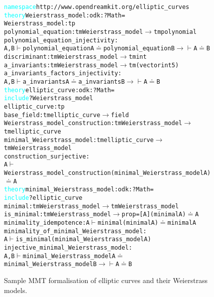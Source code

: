 \begin{figure}
\begin{small}
\begin{alltt}
\textcolor{cyan}{namespace} http://www.opendreamkit.org/elliptic_curves \RS
\textcolor{cyan}{theory} Weierstrass_model : odk:?Math = 
  Weierstrass_model : tp \RS
  polynomial_equation : tm Weierstrass_model \(\rightarrow\) tm polynomial \RS
  polynomial_equation_injectivity : 
    {A, B} \(\vdash\) polynomial_equation A \(\doteq\)  polynomial_equation B \(\rightarrow\) \(\vdash\) A \(\doteq\)  B \RS
  discriminant : tm Weierstrass_model \(\rightarrow\) tm int \RS
  a_invariants : tm Weierstrass_model \(\rightarrow\) tm (vector int 5) \RS
  a_invariants_factors_injectivity : 
    {A,B} \(\vdash\) a_invariants A \(\doteq\) a_invariants B \(\rightarrow\)\(\vdash\) A \(\doteq\) B \RS
\GS
\textcolor{cyan}{theory} elliptic_curve : odk:?Math = 
  \textcolor{cyan}{include} ?Weierstrass_model  \RS
  elliptic_curve : tp  \RS
  base_field : tm elliptic_curve \(\rightarrow\) field \RS
  Weierstrass_model_construction : tm Weierstrass_model \(\rightarrow\) tm elliptic_curve \RS
  minimal_Weierstrass_model : tm elliptic_curve \(\rightarrow\) tm Weierstrass_model \RS
  construction_surjective: 
    {A} \(\vdash\) Weierstrass_model_construction (minimal_Weierstrass_model A) \(\doteq\) A  \RS
\GS
\textcolor{cyan}{theory} minimal_Weierstrass_model : odk:?Math =
  \textcolor{cyan}{include} ?elliptic_curve \RS
  minimal : tm Weierstrass_model  \(\rightarrow\)  tm Weierstrass_model \RS
  is_minimal : tm Weierstrass_model  \(\rightarrow\)  prop \US = [A] (minimal A) \(\doteq\) A \RS
  minimality_idempotence : {A} \(\vdash\) minimal (minimal A) \(\doteq\) minimal A \RS
  minimality_of_minimal_Weierstrass_model : 
    {A} \(\vdash\) is_minimal (minimal_Weierstrass_model A)  \RS
  injective_minimal_Weierstrass_model : 
    {A,B} \(\vdash\) minimal_Weierstrass_model A \(\doteq\) minimal_Weierstrass_model B  \(\rightarrow\) \(\vdash\) A \(\doteq\) B  \RS
\GS
\end{alltt}
\end{small}
\caption{Sample MMT formalisation of elliptic curves and their Weierstrass models.}
\label{mmt-ec}
\end{figure}

